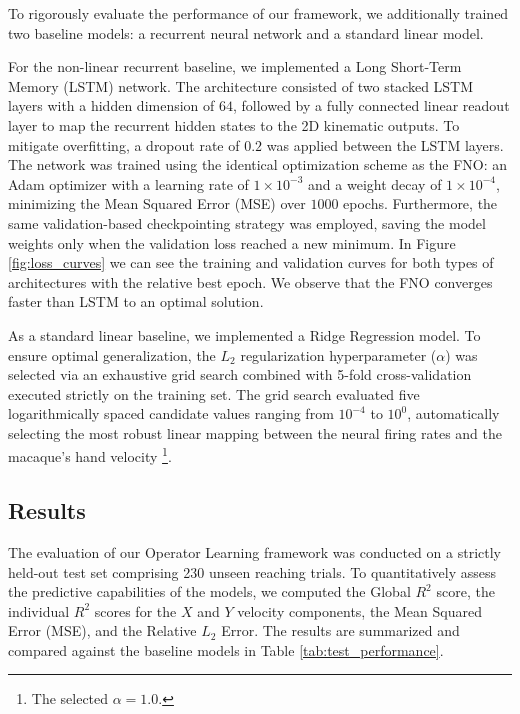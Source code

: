 To rigorously evaluate the performance of our framework, we additionally trained two baseline models: a recurrent neural network and a standard linear model. 

For the non-linear recurrent baseline, we implemented a Long Short-Term Memory (LSTM) network. The architecture consisted of two stacked LSTM layers with a hidden dimension of $64$, followed by a fully connected linear readout layer to map the recurrent hidden states to the 2D kinematic outputs. To mitigate overfitting, a dropout rate of $0.2$ was applied between the LSTM layers. The network was trained using the identical optimization scheme as the FNO: an Adam optimizer with a learning rate of $1 \times 10^{-3}$ and a weight decay of $1 \times 10^{-4}$, minimizing the Mean Squared Error (MSE) over $1000$ epochs. Furthermore, the same validation-based checkpointing strategy was employed, saving the model weights only when the validation loss reached a new minimum.
In Figure \ref{fig:loss_curves} we can see the training and validation curves for both types of architectures with the relative best epoch. We observe that the FNO converges faster than LSTM to an optimal solution. 

As a standard linear baseline, we implemented a Ridge Regression model. %
To ensure optimal generalization, the $L_2$ regularization hyperparameter ($\alpha$) was selected via an exhaustive grid search combined with 5-fold cross-validation executed strictly on the training set. The grid search evaluated five logarithmically spaced candidate values ranging from $10^{-4}$ to $10^{0}$, automatically selecting the most robust linear mapping between the neural firing rates and the macaque's hand velocity \footnote{The selected $\alpha=1.0$.}.

\subsection{Results}

The evaluation of our Operator Learning framework was conducted on a strictly held-out test set comprising 230 unseen reaching trials. To quantitatively assess the predictive capabilities of the models, we computed the Global $R^2$ score, the individual $R^2$ scores for the $X$ and $Y$ velocity components, the Mean Squared Error (MSE), and the Relative $L_2$ Error. The results are summarized and compared against the baseline models in Table \ref{tab:test_performance}.

